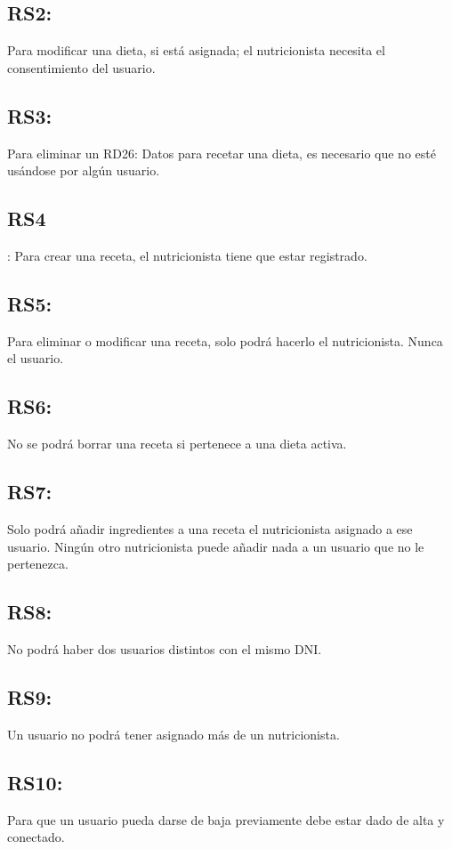 \documentclass[12pt,letterpaper]{article}
\begin{document}
\subsection{RS2:} Para modificar una dieta, si está asignada; el nutricionista necesita el consentimiento del usuario.\\
\subsection{RS3:} Para eliminar un RD26: Datos para recetar una dieta, es necesario que no esté usándose por algún usuario.\\
\subsection{RS4}: Para crear una receta, el nutricionista tiene que estar registrado.\\
\subsection{RS5:} Para eliminar o modificar una receta, solo podrá hacerlo el nutricionista. Nunca el usuario.\\
\subsection{RS6:} No se podrá borrar una receta si pertenece a una dieta activa.\\
\subsection{RS7:} Solo podrá añadir ingredientes a una receta el nutricionista asignado a ese usuario. Ningún otro nutricionista puede añadir nada a un usuario que no le pertenezca.\\
\subsection{RS8:} No podrá haber dos usuarios distintos con el mismo DNI.\\
\subsection{RS9:} Un usuario no podrá tener asignado más de un nutricionista.\\
\subsection{RS10:} Para que un usuario pueda darse de baja previamente debe estar dado de alta y conectado.\\
\end{document}
